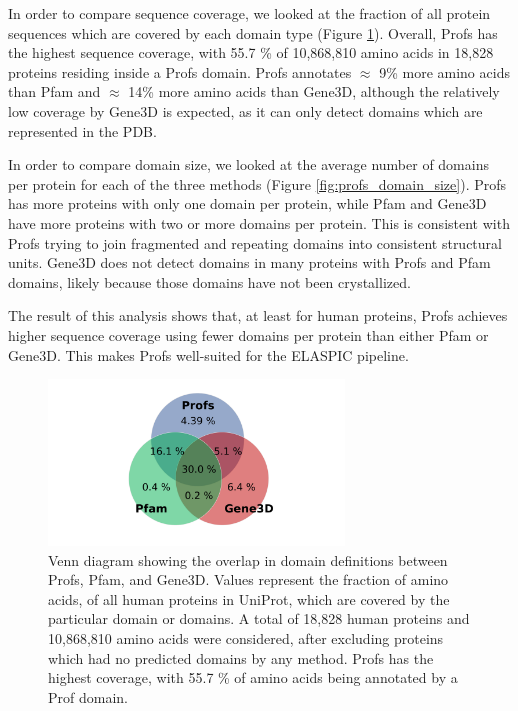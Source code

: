 In order to compare sequence coverage, we looked at the fraction of all protein sequences which are covered by each domain type (Figure \ref{fig:profs_coverage}). Overall, Profs has the highest sequence coverage, with 55.7 \% of 10,868,810 amino acids in 18,828 proteins residing inside a Profs domain. Profs annotates $\approx$ 9\% more amino acids than Pfam and $\approx$ 14\% more amino acids than Gene3D, although the relatively low coverage by Gene3D is expected, as it can only detect domains which are represented in the PDB.

In order to compare domain size, we looked at the average number of domains per protein for each of the three methods (Figure \ref{fig:profs_domain_size}). Profs has more proteins with only one domain per protein, while Pfam and Gene3D have more proteins with two or more domains per protein. This is consistent with Profs trying to join fragmented and repeating domains into consistent structural units. Gene3D does not detect domains in many proteins with Profs and Pfam domains, likely because those domains have not been crystallized.

The result of this analysis shows that, at least for human proteins, Profs achieves higher sequence coverage using fewer domains per protein than either Pfam or Gene3D. This makes Profs well-suited for the ELASPIC pipeline.


\begin{figure}[!tb]
	\centering
	\includegraphics[width=0.7\textwidth]{static/profs/uniprot_coverage_statistics.pdf}
	\caption[Profs, Pfam, and Gene3D domain overlap.]{Venn diagram showing the overlap in domain definitions between Profs, Pfam, and Gene3D. Values represent the fraction of amino acids, of all human proteins in UniProt, which are covered by the particular domain or domains. A total of 18,828 human proteins and 10,868,810 amino acids were considered, after excluding proteins which had no predicted domains by any method. Profs has the highest coverage, with 55.7 \% of amino acids being annotated by a Prof domain.}
	\label{fig:profs_coverage}
\end{figure}


